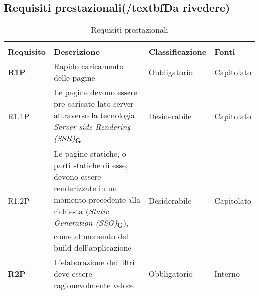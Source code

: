 \newpage
\subsection{Requisiti prestazionali(/textbf{Da rivedere})}
\begin{center}
    \centering
    \renewcommand{\arraystretch}{1.8}
    \label{tab:RequisitiPrestazionali}
    \begin{longtable}[!h]{p{50px} p{200px} p{100px} p{50px}}
        \rowcolor{white}\caption{Requisiti prestazionali}                                                                                                                                                                                                                                                              \\
        \rowcolor{logo!70} \textbf{Requisito} & \textbf{Descrizione}                                                                                                                                                                                                       & \textbf{Classificazione} & \textbf{Fonti} \\
        \textbf{R1P}                          & Rapido caricamento delle pagine                                                                                                                                                                                            & Obbligatorio             & Capitolato     \\
        R1.1P                                 & Le pagine devono essere pre-caricate lato server attraverso la tecnologia \textit{Server-side Rendering (SSR)}\textsubscript{\textbf{G}}                                                                                   & Desiderabile             & Capitolato     \\
        R1.2P                                 & Le pagine statiche, o parti statiche di esse, devono essere renderizzate in un momento precedente alla richiesta (\textit{Static Generation (SSG)}\textsubscript{\textbf{G}}), come al momento del build dell'applicazione & Desiderabile             & Capitolato     \\
        \textbf{R2P}                          & L'elaborazione dei filtri deve essere ragionevolmente veloce                                                                                                                                                               & Obbligatorio             & Interno        \\
    \end{longtable}
\end{center}

